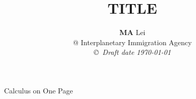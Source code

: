 \documentclass[12pt,a4paper]{book}
\begin{document}
\title{TITLE}
\author{{\bf MA} Lei  \\
@ Interplanetary Immigration Agency \\
{\small\em \copyright \ Draft date \today}}
\date{}



\newcommand{\dd}{\mathrm d}












\pagestyle{empty}

\renewcommand{\arraystretch}{1.5}

\begin{center}
Calculus on One Page
\end{center}
\end{document}

